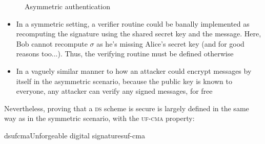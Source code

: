 \begin{figure}
    \centering

    \caption{Asymmetric authentication}
    \label{fig:digisign}
\end{figure}

\begin{itemize}
    \item In a symmetric setting, a verifier routine could be banally implemented as recomputing the signature using the shared secret key and the message. Here, Bob cannot recompute $\sigma$ as he's missing Alice's secret key (and for good reasons too...). Thus, the verifying routine must be defined otherwise
    \item In a vaguely similar manner to how an attacker could encrypt messages by itself in the asymmetric scenario, because the public key is known to everyone, any attacker can verify any signed messages, for free
\end{itemize}

Nevertheless, proving that a \textsc{ds} scheme is secure is largely defined in the same way as in the symmetric scenario, with the \textsc{uf-cma} property:

\begin{cryptogame}{dsufcma}{Unforgeable digital signatures}{uf-cma}
    

    \cseqdelay


    \cseqdelay


\end{cryptogame}

